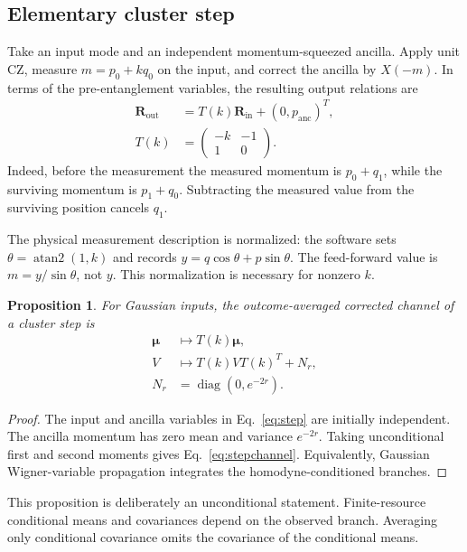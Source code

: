 \documentclass[a4paper,twocolumn,11pt,nopdfoutputerror]{quantumarticle}
\newcommand{\diag}{\operatorname{diag}}
\newtheorem{proposition}{Proposition}
\begin{document}
\subsection{Elementary cluster step}

Take an input mode and an independent momentum-squeezed ancilla. Apply unit CZ,
measure $m=p_0+kq_0$ on the input, and correct the ancilla by $X(-m)$. In terms
of the pre-entanglement variables, the resulting output relations are
\begin{equation}
 \begin{aligned}
 \bm R_{\mathrm{out}}&=T(k)\bm R_{\mathrm{in}}+(0,p_{\mathrm{anc}})^T,\\
 T(k)&=\begin{pmatrix}-k&-1\\1&0\end{pmatrix}.
 \end{aligned}
 \label{eq:step}
\end{equation}
Indeed, before the measurement the measured momentum is $p_0+q_1$, while
the surviving momentum is $p_1+q_0$. Subtracting the measured value from the
surviving position cancels $q_1$.

The physical measurement description is normalized: the software sets
$\theta=\operatorname{atan2}(1,k)$ and records
$y=q\cos\theta+p\sin\theta$. The feed-forward value is
$m=y/\sin\theta$, not $y$. This normalization is necessary for nonzero $k$.

\begin{proposition}
For Gaussian inputs, the outcome-averaged corrected channel of a cluster step is
\begin{equation}
 \begin{aligned}
 \bm\mu&\mapsto T(k)\bm\mu,\\
 V&\mapsto T(k)VT(k)^T+N_r,\\
 N_r&=\diag(0,e^{-2r}).
 \end{aligned}
 \label{eq:stepchannel}
\end{equation}
\end{proposition}
\begin{proof}
The input and ancilla variables in Eq.~\eqref{eq:step} are initially independent.
The ancilla momentum has zero mean and variance $e^{-2r}$. Taking unconditional
first and second moments gives Eq.~\eqref{eq:stepchannel}. Equivalently, Gaussian
Wigner-variable propagation integrates the homodyne-conditioned branches.
\end{proof}

This proposition is deliberately an unconditional statement. Finite-resource
conditional means and covariances depend on the observed branch. Averaging only
conditional covariance omits the covariance of the conditional means.
\end{document}
